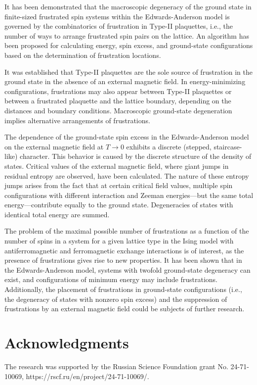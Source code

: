 \documentclass[preprint,12pt]{elsarticle}
\begin{document}
It has been demonstrated that the macroscopic degeneracy of the ground state in finite-sized frustrated spin systems within the Edwards-Anderson model is governed by the combinatorics of frustration in  Type-II plaquettes, i.e., the number of ways to arrange frustrated spin pairs on the lattice. An algorithm has been proposed for calculating energy, spin excess, and ground-state configurations based on the determination of frustration locations.

It was established that Type-II plaquettes are the sole source of frustration in the ground state in the absence of an external magnetic field. In energy-minimizing configurations, frustrations may also appear between Type-II plaquettes or between a frustrated plaquette and the lattice boundary, depending on the distances and boundary conditions. Macroscopic ground-state degeneration implies alternative arrangements of frustrations.

The dependence of the ground-state spin excess in the Edwards-Anderson model on the external magnetic field at $T \to 0$ exhibits a discrete (stepped, staircase-like) character. This behavior is caused by the discrete structure of the density of states. Critical values of the external magnetic field, where giant jumps in residual entropy are observed, have been calculated. The nature of these entropy jumps arises from the fact that at certain critical field values, multiple spin configurations with different interaction and Zeeman energies—but the same total energy—contribute equally to the ground state. Degeneracies of states with identical total energy are summed.

The problem of the maximal possible number of frustrations as a function of the number of spins in a system for a given lattice type in the Ising model with antiferromagnetic and ferromagnetic exchange interactions is of interest, as the presence of frustrations gives rise to new properties. It has been shown that in the Edwards-Anderson model, systems with twofold ground-state degeneracy can exist, and configurations of minimum energy may include frustrations. Additionally, the placement of frustrations in ground-state configurations (i.e., the degeneracy of states with nonzero spin excess) and the suppression of frustrations by an external magnetic field could be subjects of further research.


\section{Acknowledgments}

The research was supported by the Russian Science Foundation grant No. 24-71-10069, https://rscf.ru/en/project/24-71-10069/.


\end{document}
